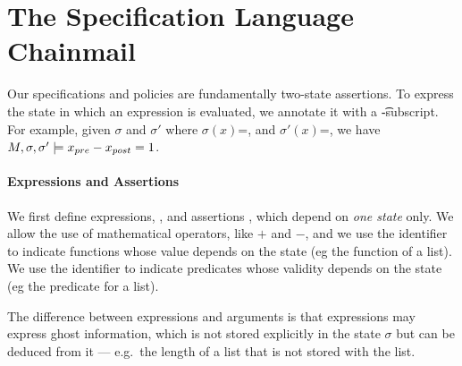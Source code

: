 \section{The Specification Language Chainmail}

\label{sec:SpecLan}

 Our specifications and policies are fundamentally two-state
assertions. To express the state in which an expression is evaluated, we annotate it with a \t-subscript. For example, given $\sigma$ and $\sigma'$ where $\sigma(x)$=,  and $\sigma'(x)$=, we have  $M,\sigma,\sigma' \models x_{{pre}} - x_{{post}} = 1$.

\paragraph{Expressions and Assertions} We first define expressions, \syntax{\sExpr},
and assertions \syntax{\A}, which depend on  {\em one
  state} only. We allow the use of mathematical operators, like $+$
and $-$, and we use the identifier      to indicate
functions whose value depends on the state (eg the function
 of a list). We use the identifier     to
indicate predicates whose validity depends on the state (eg the
predicate  for a list). 

The difference between expressions and arguments is that 
expressions may express ghost information, which is not 
stored explicitly in the state $\sigma$
but can be deduced from it ---  e.g.\ the length of a list
that is not stored with the list.

